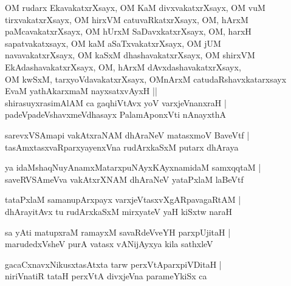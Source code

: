 \documentclass[twoside,12pt,openright]{book}
\newcounter{shloka}[chapter]
\begin{document}
\begin{shloka}%
OM rudarx EkavakatxrXsayx, OM KaM divxvakatxrXsayx, OM vuM \\
tirxvakatxrXsayx, OM hirxVM catuvaRkatxrXsayx, OM, hArxM \\
paMcavakatxrXsayx, OM hUrxM SaDavxkatxrXsayx, OM, harxH \\
sapatvakatxsayx, OM kaM aSaTxvakatxrXsayx, OM jUM \\
navavakatxrXsayx, OM kaSxM dhashavakatxrXsayx, OM shirxVM \\
EkAdashavakatxrXsayx, OM, hArxM dAvxdashavakatxrXsayx, \\
OM kwSxM, tarxyoVdavakatxrXsayx, OMnArxM catudaRshavxkatarxsayx \\
EvaM yathAkarxmaM nayxsatxvAyxH ||\\

shirasuyxrasimAlAM ca gaqhiVtAvx yoV varxjeVnanxraH |\\
padeVpadeVshavxmeVdhasayx PalamAponxVti nAnayxthA 
\end{shloka}

\begin{shloka}%
sarevxVSAmapi vakAtxraNAM dhAraNeV matasxmoV BaveVtf |\\
tasAmxtasxvaRparxyayenxVna rudArxkaSxM putarx dhAraya
\end{shloka}

\begin{shloka}%
ya idaMshaqNuyAnamxMatarxpuNAyxKAyxnamidaM samxqqtaM |\\
saveRVSAmeVva vakAtxrXNAM dhAraNeV yataPxlaM laBeVtf
\end{shloka}

\begin{shloka}%
tataPxlaM samanupArxpayx varxjeVtasxvXgARpavagaRtAM |\\
dhArayitAvx tu rudArxkaSxM mirxyateV yaH kiSxtw naraH 
\end{shloka}

\begin{shloka}%
sa yAti matupxraM ramayxM savaRdeVveYH parxpUjitaH |\\
marudedxVsheV purA vatasx vANijAyxya kila sathxleV 
\end{shloka}

\begin{shloka}%
gacaCxnavxNikusxtasAtxta tarw perxVtAparxpiVDitaH |\\
niriVnatiR tataH perxVtA divxjeVna parameYkiSx ca 
\end{shloka}
\end{document}
